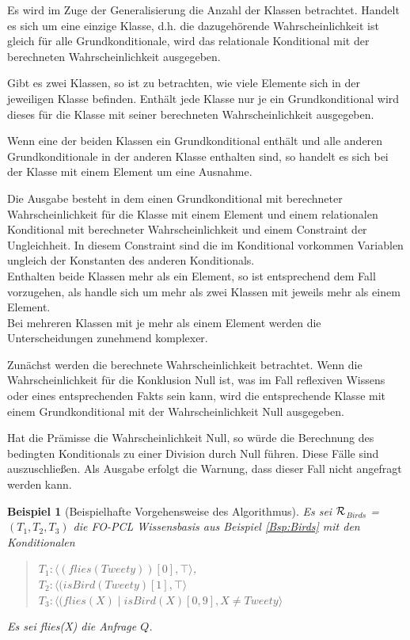 \documentclass[a4paper, 11pt]{book}
\newtheorem{Bsp}{Beispiel}[section]
\begin{document}
{Es wird im Zuge der Generalisierung die Anzahl der Klassen betrachtet. Handelt es sich um eine einzige Klasse, d.h. die dazugehörende Wahrscheinlichkeit ist gleich für alle Grundkonditionale, wird das relationale Konditional mit der berechneten Wahrscheinlichkeit ausgegeben.

Gibt es zwei Klassen, so ist zu betrachten, wie viele Elemente sich in der jeweiligen Klasse befinden. Enthält jede Klasse nur je ein Grundkonditional wird dieses für die Klasse mit seiner berechneten Wahrscheinlichkeit ausgegeben.

Wenn eine der beiden Klassen ein Grundkonditional enthält und alle anderen Grundkonditionale in der anderen Klasse enthalten sind, so handelt es sich bei der Klasse mit einem Element um eine Ausnahme.

Die Ausgabe besteht in dem einen Grundkonditional mit berechneter Wahrscheinlichkeit für die Klasse mit einem Element und einem relationalen Konditional mit berechneter Wahrscheinlichkeit und einem Constraint der Ungleichheit. In diesem Constraint sind die im Konditional vorkommen Variablen ungleich der Konstanten des anderen Konditionals.\\  

Enthalten beide Klassen mehr als ein Element, so ist entsprechend dem Fall vorzugehen, als handle sich um mehr als zwei Klassen mit jeweils mehr als einem Element.\\

Bei mehreren Klassen mit je mehr als einem Element werden die Unterscheidungen zunehmend komplexer.

Zunächst werden die berechnete Wahrscheinlichkeit betrachtet. Wenn die Wahrscheinlichkeit für die Konklusion Null ist, was im Fall reflexiven Wissens oder eines entsprechenden Fakts sein kann, wird die entsprechende Klasse mit einem Grundkonditional mit der Wahrscheinlichkeit Null ausgegeben.

Hat die Prämisse die Wahrscheinlichkeit Null, so würde die Berechnung des bedingten Konditionals zu einer Division durch Null führen. Diese Fälle sind auszuschließen. Als Ausgabe erfolgt die Warnung, dass dieser Fall nicht angefragt werden kann.

\begin{Bsp}[Beispielhafte Vorgehensweise des Algorithmus]
	
	Es sei  $ \cal{R} $$_{Birds}  $ = $ (T_1, T_2, T_3)  $ die FO-PCL Wissensbasis aus Beispiel \ref{Bsp:Birds} mit den Konditionalen 
	\begin{quote}
		$ T_{1}  :  \langle (flies(Tweety))[0], \top \rangle $,\\
		$ T_{2} : \langle (isBird(Tweety) [1], \top \rangle$\\
		$ T_{3} : \langle (flies(X) \mid isBird(X)[0,9], X \neq Tweety \rangle$\\
	\end{quote}
	Es sei flies(X) die Anfrage $ Q $.
	

\end{Bsp}}
\end{document}
